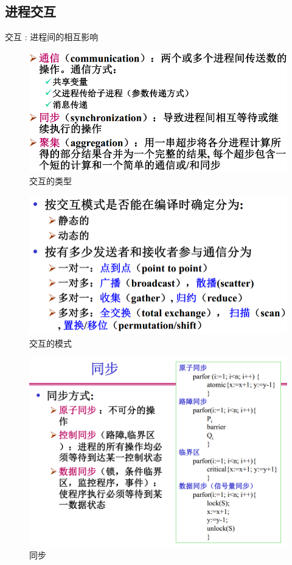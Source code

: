 \documentclass[UTF8,a4paper]{ctexart}
\begin{document}
\subsection{进程交互}
交互 : 进程间的相互影响
\begin{figure}[H]
  \centering
  \includegraphics[scale = 0.3]{assets/ParallelComputing_ee5c2.png}
  \caption{交互的类型}
\end{figure}

\begin{figure}[H]
  \centering
  \includegraphics[scale = 0.3]{assets/ParallelComputing_96aca.png}
  \caption{交互的模式}
\end{figure}

\begin{figure}[H]
  \centering
  \includegraphics[scale = 0.3]{assets/ParallelComputing_5d1bd.png}
  \caption{同步}
\end{figure}
\end{document}
